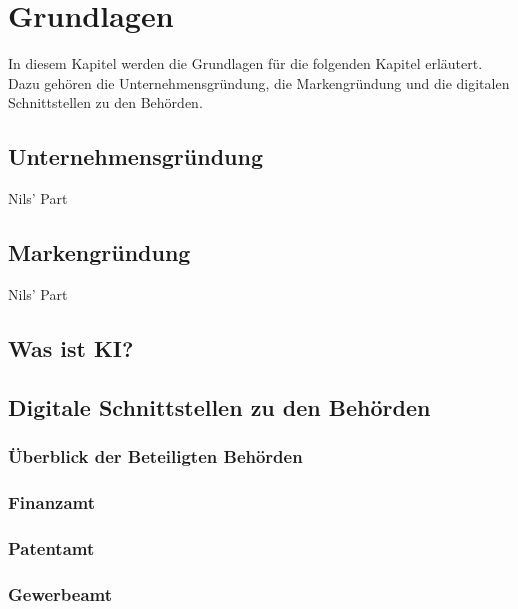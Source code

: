 \newpage

\section{Grundlagen} \label{grundlagen}
In diesem Kapitel werden die Grundlagen für die folgenden Kapitel erläutert. Dazu gehören die Unternehmensgründung, die Markengründung und die digitalen Schnittstellen zu den Behörden.


\subsection{Unternehmensgründung} \label{unternehmensgründung}

Nils' Part
\subsection{Markengründung} \label{markengründung}

Nils' Part

\subsection{Was ist KI?} \label{wasIstKI}


\subsection{Digitale Schnittstellen zu den Behörden} \label{digitaleBehoerden}

\subsubsection{Überblick der Beteiligten Behörden} \label{ueberblickDerBeteiligtenBehoerden}

\subsubsection{Finanzamt} \label{finanzamt}

\subsubsection{Patentamt} \label{patentamt}

\subsubsection{Gewerbeamt} \label{gewerbeamt}


